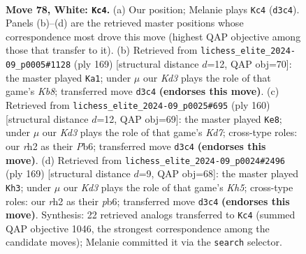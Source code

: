 \documentclass[11pt]{article}
\begin{document}
\clearpage

\begin{figure}[p]\centering
\begin{subfigure}{0.46\textwidth}\centering
\resizebox{\linewidth}{!}{%
\newchessgame
\chessboard[
  setfen={3Q4/8/5pk1/8/8/q2K2P1/7r/8 w - - 6 78},
  showmover=false,
  pgfstyle=straightmove, color=movearrow, markmove={d3-c4}
]}
\caption{}
\end{subfigure}\hfill
\begin{subfigure}{0.46\textwidth}\centering
\resizebox{\linewidth}{!}{%
\newchessgame
\chessboard[
  setfen={1q6/8/7P/6K1/4Q3/8/8/1k6 b - - 10 85},
  showmover=false,
  pgfstyle=straightmove, color=movearrow, markmove={b1-a1}
]}
\caption{}
\end{subfigure}
\\[4pt]
\begin{subfigure}{0.46\textwidth}\centering
\resizebox{\linewidth}{!}{%
\newchessgame
\chessboard[
  setfen={8/3K2q1/1P6/3Q4/8/8/8/5k2 w - - 13 81},
  showmover=false,
  pgfstyle=straightmove, color=movearrow, markmove={d7-e8}
]}
\caption{}
\end{subfigure}\hfill
\begin{subfigure}{0.46\textwidth}\centering
\resizebox{\linewidth}{!}{%
\newchessgame
\chessboard[
  setfen={8/8/1P3q2/8/4Q2k/8/3K4/8 b - - 14 85},
  showmover=false,
  pgfstyle=straightmove, color=movearrow, markmove={h4-h3}
]}
\caption{}
\end{subfigure}
\caption{\textbf{Move 78, White: \texttt{Kc4}.} (a) Our position; Melanie plays \texttt{Kc4} (\texttt{d3c4}). Panels (b)--(d) are the retrieved master positions whose correspondence most drove this move (highest QAP objective among those that transfer to it). (b) Retrieved from \texttt{lichess\_elite\_2024-09\_p0005\#1128} (ply 169) [structural distance $d$=12, QAP obj=70]: the master played \texttt{Ka1}; under $\mu$ our \emph{Kd3} plays the role of that game's \emph{Kb8}; transferred move \texttt{d3c4} \textbf{(endorses this move)}. (c) Retrieved from \texttt{lichess\_elite\_2024-09\_p0025\#695} (ply 160) [structural distance $d$=12, QAP obj=69]: the master played \texttt{Ke8}; under $\mu$ our \emph{Kd3} plays the role of that game's \emph{Kd7}; cross-type roles: our \emph{r}h2 as their \emph{P}b6; transferred move \texttt{d3c4} \textbf{(endorses this move)}. (d) Retrieved from \texttt{lichess\_elite\_2024-09\_p0024\#2496} (ply 169) [structural distance $d$=9, QAP obj=68]: the master played \texttt{Kh3}; under $\mu$ our \emph{Kd3} plays the role of that game's \emph{Kh5}; cross-type roles: our \emph{r}h2 as their \emph{p}b6; transferred move \texttt{d3c4} \textbf{(endorses this move)}. Synthesis: 22 retrieved analogs transferred to \texttt{Kc4} (summed QAP objective 1046, the strongest correspondence among the candidate moves); Melanie committed it via the \texttt{search} selector.}
\label{fig:thought-m154}
\end{figure}
\end{document}
